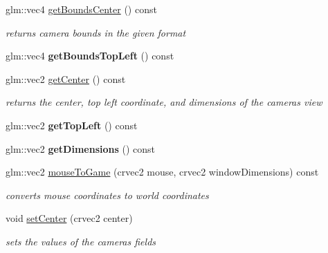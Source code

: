 \begin{DoxyCompactItemize}
glm\+::vec4 \hyperlink{classnta_1_1Camera2D_ad02d4b9a995f3919c753fd2ea6d9f8f1}{get\+Bounds\+Center} () const
\begin{DoxyCompactList}\small\item\em returns camera bounds in the given format \end{DoxyCompactList}\item 
\mbox{\label{classnta_1_1Camera2D_af3b971aa62c8e6ca7287d0d236bb3e3d}} 
glm\+::vec4 {\bfseries get\+Bounds\+Top\+Left} () const
\item 
\mbox{\label{classnta_1_1Camera2D_add5061ade3ed4eb82d3e75f6aba97f70}} 
glm\+::vec2 \hyperlink{classnta_1_1Camera2D_add5061ade3ed4eb82d3e75f6aba97f70}{get\+Center} () const
\begin{DoxyCompactList}\small\item\em returns the center, top left coordinate, and dimensions of the camera\textquotesingle{}s view \end{DoxyCompactList}\item 
\mbox{\label{classnta_1_1Camera2D_adbfd52308be6b9c56736400ac67b65c5}} 
glm\+::vec2 {\bfseries get\+Top\+Left} () const
\item 
\mbox{\label{classnta_1_1Camera2D_a2f688f531a999d2b427ef63a18859e6d}} 
glm\+::vec2 {\bfseries get\+Dimensions} () const
\item 
glm\+::vec2 \hyperlink{classnta_1_1Camera2D_afb20fb9823724babdc8d18b17336169c}{mouse\+To\+Game} (crvec2 mouse, crvec2 window\+Dimensions) const
\begin{DoxyCompactList}\small\item\em converts mouse coordinates to world coordinates \end{DoxyCompactList}\item 
\mbox{\label{classnta_1_1Camera2D_a11a7edceed0964b375fbfe154b9a9895}} 
void \hyperlink{classnta_1_1Camera2D_a11a7edceed0964b375fbfe154b9a9895}{set\+Center} (crvec2 center)
\begin{DoxyCompactList}\small\item\em sets the values of the camera\textquotesingle{}s fields \end{DoxyCompactList}\item 
\mbox{\label{classnta_1_1Camera2D_a5e887ee36c95789e3455ab2f3bb3f568}} 

\end{DoxyCompactItemize}
